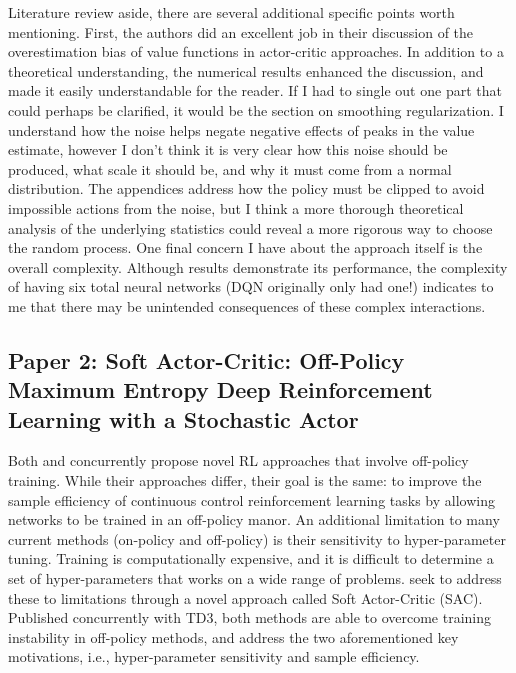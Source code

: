 \documentclass{article}
\begin{document}
Literature review aside, there are several additional specific points worth mentioning. First, the authors did an excellent job in their discussion of the overestimation bias of value functions in actor-critic approaches. In addition to a theoretical understanding, the numerical results enhanced the discussion, and made it easily understandable for the reader. If I had to single out one part that could perhaps be clarified, it would be the section on smoothing regularization. I understand how the noise helps negate negative effects of peaks in the value estimate, however I don't think it is very clear how this noise should be produced, what scale it should be, and why it must come from a normal distribution. The appendices address how the policy must be clipped to avoid impossible actions from the noise, but I think a more thorough theoretical analysis of the underlying statistics could reveal a more rigorous way to choose the random process. One final concern I have about the approach itself is the overall complexity. Although results demonstrate its performance, the complexity of having six total neural networks (DQN originally only had one!) indicates to me that there may be unintended consequences of these complex interactions.

\subsection{Paper 2: Soft Actor-Critic: Off-Policy Maximum Entropy Deep Reinforcement Learning with a Stochastic Actor\citep{sac}}
Both \citep{td3} and \citep{sac} concurrently propose novel RL approaches that involve off-policy training. While their approaches differ, their goal is the same: to improve the sample efficiency of continuous control reinforcement learning tasks by allowing networks to be trained in an off-policy manor. An additional limitation to many current methods (on-policy and off-policy) is their sensitivity to hyper-parameter tuning. Training is computationally expensive, and it is difficult to determine a set of hyper-parameters that works on a wide range of problems. \cite{sac} seek to address these to limitations through a novel approach called Soft Actor-Critic (SAC). Published concurrently with TD3, both methods are able to overcome training instability in off-policy methods, and address the two aforementioned key motivations, i.e., hyper-parameter sensitivity and sample efficiency. 
\end{document}
